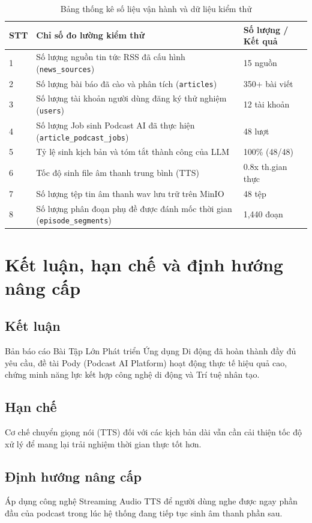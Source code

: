 \documentclass[12pt,a4paper]{report}
\begin{document}
\begin{table}[h!]
\centering
\begin{tabular}{lp{8cm}l}
\toprule
\textbf{STT} & \textbf{Chỉ số đo lường kiểm thử} & \textbf{Số lượng / Kết quả} \\
\midrule
1 & Số lượng nguồn tin tức RSS đã cấu hình (\texttt{news\_sources}) & 15 nguồn \\
2 & Số lượng bài báo đã cào và phân tích (\texttt{articles}) & 350+ bài viết \\
3 & Số lượng tài khoản người dùng đăng ký thử nghiệm (\texttt{users}) & 12 tài khoản \\
4 & Số lượng Job sinh Podcast AI đã thực hiện (\texttt{article\_podcast\_jobs}) & 48 lượt \\
5 & Tỷ lệ sinh kịch bản và tóm tắt thành công của LLM & 100\% (48/48) \\
6 & Tốc độ sinh file âm thanh trung bình (TTS) & 0.8x th.gian thực \\
7 & Số lượng tệp tin âm thanh wav lưu trữ trên MinIO & 48 tệp \\
8 & Số lượng phân đoạn phụ đề được đánh mốc thời gian (\texttt{episode\_segments}) & 1,440 đoạn \\
\bottomrule
\end{tabular}
\caption{Bảng thống kê số liệu vận hành và dữ liệu kiểm thử}
\label{tab:test_metrics}
\end{table}

\section{Kết luận, hạn chế và định hướng nâng cấp}
\subsection{Kết luận}
Bản báo cáo Bài Tập Lớn Phát triển Ứng dụng Di động đã hoàn thành đầy đủ yêu cầu, đề tài Pody (Podcast AI Platform) hoạt động thực tế hiệu quả cao, chứng minh năng lực kết hợp công nghệ di động và Trí tuệ nhân tạo.

\subsection{Hạn chế}
Cơ chế chuyển giọng nói (TTS) đối với các kịch bản dài vẫn cần cải thiện tốc độ xử lý để mang lại trải nghiệm thời gian thực tốt hơn.

\subsection{Định hướng nâng cấp}
Áp dụng công nghệ Streaming Audio TTS để người dùng nghe được ngay phần đầu của podcast trong lúc hệ thống đang tiếp tục sinh âm thanh phần sau.
\end{document}
